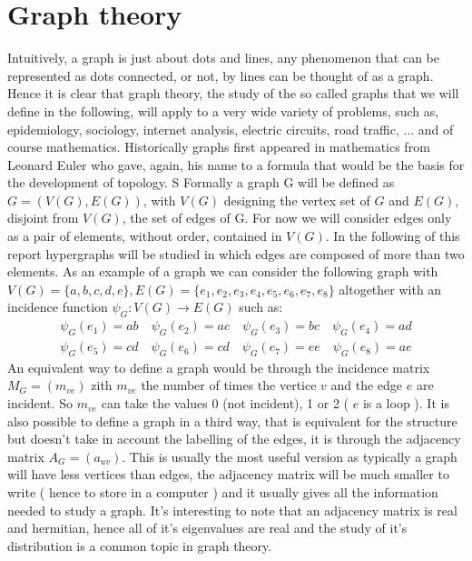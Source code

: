 \newtheorem{theorem}{Theorem}[section]
\newtheorem{corollary}{Corollary}[theorem]
\newtheorem{lemma}[theorem]{Lemma}

\section{Graph theory}
Intuitively, a graph is just about dots and lines, any phenomenon that can be represented as dots connected, or not, by lines can be thought of as a graph. Hence it is clear that graph theory, the study of the so called graphs that we will define in the following, will apply to a very wide variety of problems, such as, epidemiology, sociology, internet analysis, electric circuits, road traffic, ... and of course mathematics. Historically graphs first appeared in mathematics from Leonard Euler who gave, again, his name to a formula that would be the basis for the development of topology. S
\newline
Formally a graph G will be defined as $G = ( V(G), E(G) )$, with $V(G)$ designing the vertex set of $G$ and $E(G)$, disjoint from $V(G)$, the set of edges of G. For now we will consider edges only as a pair of elements, without order, contained in $V(G)$. In the following of this report hypergraphs will be studied in which edges are composed of more than two elements.
\newline
As an example of a graph we can consider the following graph with $ V(G) = \{a, b, c, d, e\}, E(G) = \{e_1,e_2, e_3, e_4, e_5, e_6, e_7, e_8\}$ altogether with an incidence function $\psi_G : V(G) \rightarrow E(G) $ such as:
\begin{align*}
    \psi_G(e_1) = ab\quad
    \psi_G(e_2) = ac\quad
    \psi_G(e_3) = bc\quad
    \psi_G(e_4) = ad\\
    \psi_G(e_5) = cd\quad
    \psi_G(e_6) = cd\quad
    \psi_G(e_7) = ee\quad
    \psi_G(e_8) = ae
\end{align*}
An equivalent way to define a graph would be through the incidence matrix $M_G = (m_{ve}) $ zith $m_{ve}$ the number of times the vertice $v$ and the edge $e$ are incident. So $m_{ve}$ can take the values 0 (not incident), 1 or 2 ( $e$ is a loop ).
It is also possible to define a graph in a third way, that is equivalent for the structure but doesn't take in account the labelling of the edges, it is through the adjacency matrix $A_G = (a_{uv})$. This is usually the most useful version as typically a graph will have less vertices than edges, the adjacency matrix will be much smaller to write ( hence to store in a computer ) and it usually gives all the information needed to study a graph. It's interesting to note that an adjacency matrix is real and hermitian, hence all of it's eigenvalues are real and the study of it's distribution is a common topic in graph theory.
